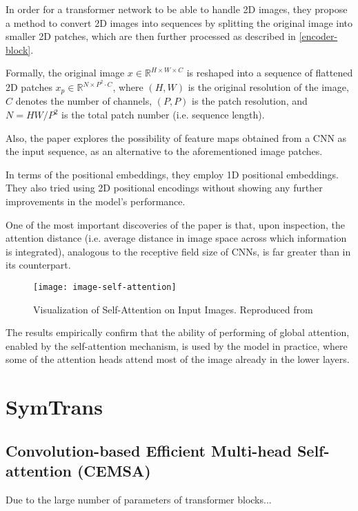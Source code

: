In order for a transformer network to be able to handle 2D images, they propose a method to convert 2D images into sequences by splitting the original image into smaller 2D patches, which are then further processed as described in \ref{encoder-block}.

Formally, the original image $x \in \mathbb{R}^{H \times W \times C}$ is reshaped into a sequence of flattened 2D patches $x_p \in \mathbb{R}^{N \times P^2 \cdot C}$, where $(H,W)$ is the original resolution of the image, $C$ denotes the number of channels, $(P,P)$ is the patch resolution, and $N=HW/P^2$ is the total patch number (i.e. sequence length).

Also, the paper explores the possibility of feature maps obtained from a CNN as the input sequence, as an alternative to the aforementioned image patches.

In terms of the positional embeddings, they employ 1D positional embeddings. They also tried using 2D positional encodings without showing any further improvements in the model's performance.

One of the most important discoveries of the paper is that, upon inspection, the attention distance (i.e. average distance in image space across which information is integrated), analogous to the receptive field size of CNNs, is far greater than in its counterpart. 

\begin{figure}[h!]
    \texttt{[image: image-self-attention]}
    \caption{Visualization of Self-Attention on Input Images. Reproduced from }
    \label{fig:image-self-attention}
\end{figure}

The results empirically confirm that the ability of performing of global attention, enabled by the self-attention mechanism, is used by the model in practice, where some of the attention heads attend most of the image already in the lower layers.

\section{SymTrans}
\label{symtrans}

\subsection{Convolution-based Efficient Multi-head Self-attention (CEMSA)}
\label{cemsa-block}
Due to the large number of parameters of transformer blocks...

